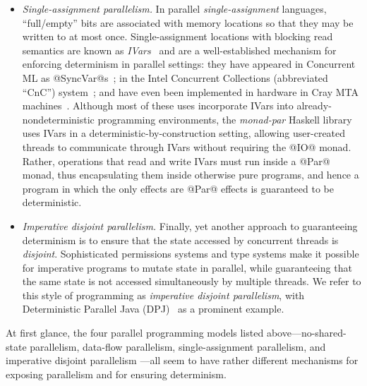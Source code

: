 \begin{itemize}
\item \emph{Single-assignment parallelism.}  In
  parallel \emph{single-assignment} languages, ``full/empty'' bits are
  associated with memory locations so that they may be written to at
  most once. Single-assignment locations with blocking read semantics
  are known as \emph{IVars}~\cite{IStructures} and are a
  well-established mechanism for enforcing determinism in parallel
  settings: they have appeared in Concurrent ML as
  @SyncVar@s~\cite{reppy-cml-book}; in the Intel Concurrent
  Collections (abbreviated ``CnC'') system~\cite{CnC}; and have even
  been implemented in hardware in Cray MTA machines~\cite{cray-mta}.
   Although most of these
  uses incorporate IVars into already-nondeterministic programming
  environments, the \emph{monad-par} Haskell library~\cite{monad-par}
  uses IVars in a deterministic-by-construction setting, allowing
  user-created threads to communicate through IVars without requiring
  the @IO@ monad.  Rather, operations that read and write IVars must
  run inside a @Par@ monad, thus encapsulating them inside otherwise
  pure programs, and hence a program in which the only effects are
  @Par@ effects is guaranteed to be deterministic.

\item \emph{Imperative disjoint parallelism.}
  Finally, yet another approach to guaranteeing determinism is to
  ensure that the state accessed by concurrent threads is
  \emph{disjoint}.  Sophisticated permissions systems and type systems
  make it possible for imperative programs to mutate state in
  parallel, while guaranteeing that the same state is not accessed
  simultaneously by multiple threads.  We refer to this style of
  programming as \emph{imperative disjoint parallelism}, with
  Deterministic Parallel Java (DPJ)~\cite{dpj-oopsla} as a prominent
  example.
\end{itemize}

At first glance, the four parallel programming models listed
above---no-shared-state parallelism, data-flow parallelism,
single-assignment parallelism, and imperative disjoint parallelism
---all seem to have rather different mechanisms for exposing
parallelism and for ensuring determinism.



